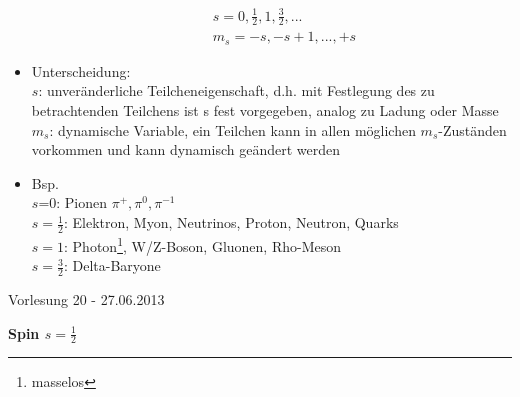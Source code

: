 \documentclass[10pt,article,colorback,accentcolor=tud9d]{scrartcl}
\begin{document}
\begin{itemize}
\begin{align}
      &\quad s=0,\frac{1}{2},1,\frac{3}{2},... \nonumber\\
      &\quad m_s=-s,-s+1,...,+s\nonumber
      \end{align}
    \item Unterscheidung:\\
      $s$: unveränderliche Teilcheneigenschaft, d.h. mit Festlegung des zu betrachtenden Teilchens ist s fest vorgegeben, analog zu Ladung oder Masse\\
      $m_s$: dynamische Variable, ein Teilchen kann in allen möglichen $m_s$-Zuständen vorkommen und kann dynamisch geändert werden 
    \item Bsp.\\
      $s$=0: Pionen $\pi^+,\pi^0,\pi^{-1}$\\
      $s=\frac{1}{2}$: Elektron, Myon, Neutrinos, Proton, Neutron, Quarks\\
      $s=1$: Photon\footnote{masselos}, W/Z-Boson, Gluonen, Rho-Meson\\
      $s=\frac{3}{2}$: Delta-Baryone
  \end{itemize}
  
  
\begin{flushright}
Vorlesung 20 - 27.06.2013
\end{flushright}

\noindent\textbf{Spin $s=\frac{1}{2}$}
\end{document}
